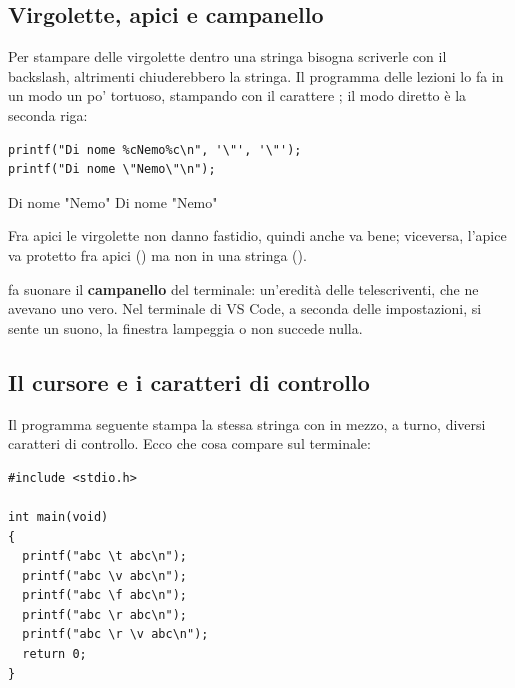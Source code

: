 \subsection{Virgolette, apici e campanello}

Per stampare delle virgolette dentro una stringa bisogna scriverle con il
backslash, altrimenti chiuderebbero la stringa. Il programma delle lezioni
lo fa in un modo un po' tortuoso, stampando con  il carattere
; il modo diretto è la seconda riga:

\begin{affianco}[0.56][c]
\begin{lstlisting}[style=c]
printf("Di nome %cNemo%c\n", '\"', '\"');
printf("Di nome \"Nemo\"\n");
\end{lstlisting}
\risultato
\begin{console}
Di nome "Nemo"
Di nome "Nemo"
\end{console}
\end{affianco}

Fra apici le virgolette non danno fastidio, quindi anche  va bene;
viceversa, l'apice va protetto fra apici () ma non
in una stringa ().

 fa suonare il
\textbf{campanello} del terminale: un'eredità delle telescriventi, che ne
avevano uno vero. Nel terminale di VS Code, a seconda delle impostazioni, si
sente un suono, la finestra lampeggia o non succede nulla.

\subsection{Il cursore e i caratteri di controllo}

Il programma seguente stampa la stessa stringa con in mezzo, a turno,
diversi caratteri di controllo. Ecco che cosa compare sul terminale:

\begin{affianco}[0.5][c]
\begin{lstlisting}[style=c, name=escape.c]
#include <stdio.h>

int main(void)
{
  printf("abc \t abc\n");
  printf("abc \v abc\n");
  printf("abc \f abc\n");
  printf("abc \r abc\n");
  printf("abc \r \v abc\n");
  return 0;
}
\end{lstlisting}
\risultato
{}
\end{affianco}

